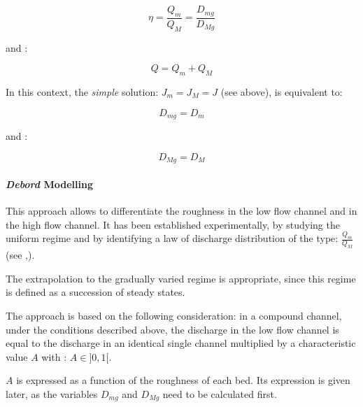 \begin{equation}
  \eta = \frac{Q_m}{Q_M} = \frac{D_{mg}}{D_{Mg}}
\end{equation}

and :

\begin{equation}
  Q = Q_m + Q_M
\end{equation}

\vspace{0.5cm}

In this context, the \textit{simple} solution: $J_m = J_M = J$ (see above), is equivalent to:

\begin{equation}
  D_{mg} = D_m
\end{equation}

and : 

\begin{equation}
  D_{Mg} = D_M
\end{equation}

\paragraph{\emph{Debord} Modelling\\} \label{ModDeb}

\hspace*{1cm}

This approach allows to differentiate the roughness in the low flow channel and in the high flow channel.
It has been established experimentally, by studying the uniform regime
and by identifying a law of discharge distribution of the type: $\frac{Q_m}{Q_M}$ (see \cite{UAN75},\cite{NICOLLET79}).

\vspace{0.5cm}

The extrapolation to the gradually varied regime is appropriate, since this regime is defined as a succession of steady states.  

\vspace{0.5cm}

The approach is based on the following consideration: in a compound channel, under the conditions described above, the discharge in the low flow channel is equal to the discharge in an identical single channel multiplied by a characteristic value $A$ with : $A \in ]0,1[$.

\vspace{0.5cm}

$A$ is expressed as a function of the roughness of each bed. Its expression is given later, as the variables $D_{mg}$ and $D_{Mg}$ need to be calculated first.

